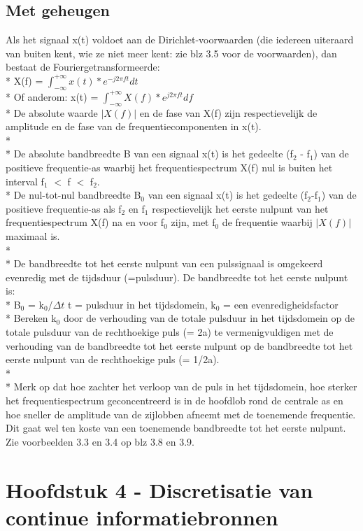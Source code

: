 \documentclass[10pt]{article}
\begin{document}
\subsection{Met geheugen}
Als het signaal x(t) voldoet aan de Dirichlet-voorwaarden (die iedereen uiteraard van buiten kent, wie ze niet meer kent: zie blz 3.5 voor de voorwaarden), dan bestaat de Fouriergetransformeerde:\\*
X(f) = $\int_{-\infty}^{+\infty}x(t)*e^{-j2\pi ft}dt$\\*
Of anderom: x(t) = $\int_{-\infty}^{+\infty}X(f)*e^{j2\pi ft}df$\\*
{\scriptsize De absolute waarde $|X(f)|$ en de fase van X(f) zijn respectievelijk de amplitude en de fase van de frequentiecomponenten in x(t).}\\*\\*
De absolute bandbreedte B van een signaal x(t) is het gedeelte (f$_2$ - f$_1$) van de positieve frequentie-as waarbij het frequentiespectrum X(f) nul is buiten het interval f$_1$ $<$ f $<$ f$_2$.\\*
De nul-tot-nul bandbreedte B$_0$ van een signaal x(t) is het gedeelte (f$_2$-f$_1$) van de positieve frequentie-as als f$_2$ en f$_1$ respectievelijk het eerste nulpunt van het frequentiespectrum X(f) na en voor f$_0$ zijn, met f$_0$ de frequentie waarbij $|X(f)|$ maximaal is.\\*\\*
De bandbreedte tot het eerste nulpunt van een pulssignaal is omgekeerd evenredig met de tijdsduur (=pulsduur). De bandbreedte tot het eerste nulpunt is:\\*
B$_0$ = k$_0$/$\Delta t$ {\scriptsize t = pulsduur in het tijdsdomein, k$_0$ = een evenredigheidsfactor}\\*
{\scriptsize Bereken k$_0$ door de verhouding van de totale pulsduur in het tijdsdomein op de totale pulsduur van de rechthoekige puls (= 2a) te vermenigvuldigen met de verhouding van de bandbreedte tot het eerste nulpunt op de bandbreedte tot het eerste nulpunt van de rechthoekige puls (= 1/2a).}\\*\\*
Merk op dat hoe zachter het verloop van de puls in het tijdsdomein, hoe sterker het frequentiespectrum geconcentreerd is in de hoofdlob rond de centrale as en hoe sneller de amplitude van de zijlobben afneemt met de toenemende frequentie. Dit gaat wel ten koste van een toenemende bandbreedte tot het eerste nulpunt. Zie voorbeelden 3.3 en 3.4 op blz 3.8 en 3.9.
\section{Hoofdstuk 4 - Discretisatie van continue informatiebronnen}
\end{document}
